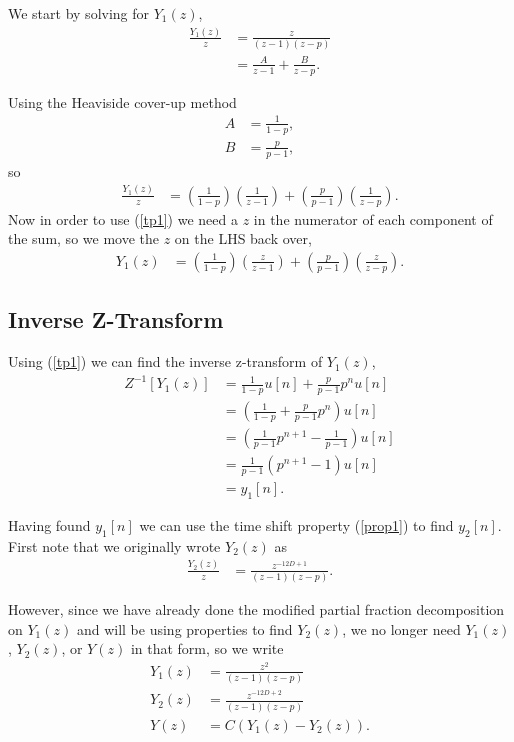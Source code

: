 \documentclass[letterpaper]{article}
\begin{document}
We start by solving for $Y_1(z)$,
\begin{align}
	\frac{Y_1(z)}{z} &= \frac{z}{(z-1)(z - p)} \\
					 &= \frac{A}{z-1} + \frac{B}{z-p}.
\end{align}

Using the Heaviside cover-up method
\begin{align}
	A &= \frac{1}{1 - p}, \\
	B &= \frac{p}{p - 1},
\end{align}
so
\begin{align}
	\frac{Y_1(z)}{z} &= \left(\frac{1}{1 - p}\right)\left(\frac{1}{z-1}\right) 
						+ \left(\frac{p}{p - 1}\right)\left(\frac{1}{z-p}\right).
\end{align}
Now in order to use (\ref{tp1}) we need a $z$ in the numerator of each component of the sum, so we move the $z$ on the LHS back over,
\begin{align}
	Y_1(z) &= \left(\frac{1}{1 - p}\right)\left(\frac{z}{z-1}\right) 
	+ \left(\frac{p}{p - 1}\right)\left(\frac{z}{z-p}\right).
\end{align}

\pagebreak
\subsection{Inverse Z-Transform}
Using (\ref{tp1}) we can find the inverse z-transform of $Y_1(z)$,
\begin{align}
	Z^{-1}\left[Y_1(z)\right] &= \frac{1}{1 - p}u[n] + \frac{p}{p - 1}p^n u[n] \\
							  &= \left(\frac{1}{1 - p} + \frac{p}{p - 1}p^n \right)u[n] \\
							  &= \left(\frac{1}{p - 1}p^{n+1} - \frac{1}{p - 1} \right)u[n] \\
							  &= \frac{1}{p - 1}\left(p^{n+1} - 1 \right)u[n] \\
							  &= y_1[n].
\end{align}

Having found $y_1[n]$ we can use the time shift property (\ref{prop1}) to find $y_2[n]$. First note that we originally wrote $Y_2(z)$ as
\begin{align}
	\frac{Y_2(z)}{z} &= \frac{z^{-12D+1}}{(z-1)(z - p)}.
\end{align}

However, since we have already done the modified partial fraction decomposition on $Y_1(z)$ and will be using properties to find $Y_2(z)$, we no longer need $Y_1(z)$, $Y_2(z)$, or $Y(z)$ in that form, so we write
\begin{align}
	Y_1(z) &= \frac{z^2}{(z-1)(z - p)} \\
	Y_2(z) &= \frac{z^{-12D+2}}{(z-1)(z - p)} \\
	Y(z)   &= C \left(Y_1(z) - Y_2(z) \right).
\end{align}
\end{document}
